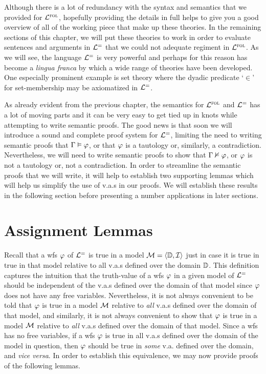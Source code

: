 Although there is a lot of redundancy with the syntax and semantics that we provided for $\mathcal{L}^{\textsc{fol}}$, hopefully providing the details in full helps to give you a good overview of all of the working piece that make up these theories.
In the remaining sections of this chapter, we will put these theories to work in order to evaluate sentences and arguments in $\mathcal{L}^{=}$ that we could not adequate regiment in $\mathcal{L}^{\textsc{fol}}$.
As we will see, the language $\mathcal{L}^{=}$ is very powerful and perhaps for this reason has become a \textit{lingua franca} by which a wide range of theories have been developed.
One especially prominent example is set theory where the dyadic predicate `$\in$' for set-membership may be axiomatized in $\mathcal{L}^{=}$.

As already evident from the previous chapter, the semantics for $\mathcal{L}^{\textsc{fol}}$ and $\mathcal{L}^{=}$ has a lot of moving parts and it can be very easy to get tied up in knots while attempting to write semantic proofs. 
The good news is that soon we will introduce a sound and complete proof system for $\mathcal{L}^{=}$, limiting the need to writing semantic proofs that $\Gamma \vDash \varphi$, or that $\varphi$ is a tautology or, similarly, a contradiction.
Nevertheless, we will need to write semantic proofs to show that $\Gamma \nvDash \varphi$, or $\varphi$ is not a tautology or, not a contradiction.
In order to streamline the semantic proofs that we will write, it will help to establish two supporting lemmas which will help us simplify the use of v.a.s in our proofs.
We will establish these results in the following section before presenting a number applications in later sections.




\section{Assignment Lemmas}%
  \label{sec:AssignmentLemmas}

Recall that a wfs $\varphi$ of $\mathcal{L}^{=}$ is true in a model $\mathcal{M} = \langle\mathbb{D}, \mathcal{I}\rangle$ just in case it is true in true in that model relative to all v.a.s defined over the domain $\mathbb{D}$.
This definition captures the intuition that the truth-value of a wfs $\varphi$ in a given model of $\mathcal{L}^{=}$ should be independent of the v.a.s defined over the domain of that model since $\varphi$ does not have any free variables.
Nevertheless, it is not always convenient to be told that $\varphi$ is true in a model $\mathcal{M}$ relative to \textit{all} v.a.s defined over the domain of that model, and similarly, it is not always convenient to show that $\varphi$ is true in a model $\mathcal{M}$ relative to \textit{all} v.a.s defined over the domain of that model.
Since a wfs has no free variables, if a wfs $\varphi$ is true in all v.a.s defined over the domain of the model in question, then $\varphi$ should be true in \textit{some} v.a. defined over the domain, and \textit{vice versa}.
In order to establish this equivalence, we may now provide proofs of the following lemmas.

